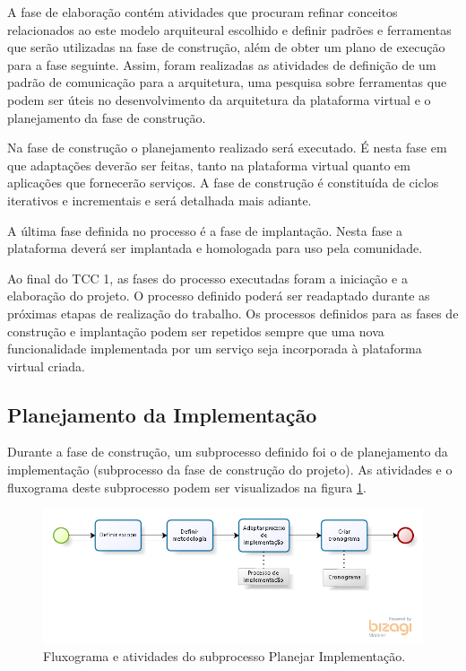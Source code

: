 A fase de elaboração contém atividades que procuram refinar conceitos relacionados ao este modelo arquiteural escolhido e definir padrões e ferramentas que serão utilizadas na fase de construção, além de obter um plano de execução para a fase seguinte. Assim, foram realizadas as atividades de definição de um padrão de comunicação para a arquitetura, uma pesquisa sobre ferramentas que podem ser úteis no desenvolvimento da arquitetura da plataforma virtual e o planejamento da fase de construção.

Na fase de construção o planejamento realizado será executado. É nesta fase em que adaptações deverão ser feitas, tanto na plataforma virtual quanto em aplicações que fornecerão serviços. A fase de construção é constituída de ciclos iterativos e incrementais e será detalhada mais adiante.

A última fase definida no processo é a fase de implantação. Nesta fase a plataforma deverá ser implantada e homologada para uso pela comunidade.

Ao final do TCC 1, as fases do processo executadas foram a iniciação e a elaboração do projeto. O processo definido poderá ser readaptado durante as próximas etapas de realização do trabalho. Os processos definidos para as fases de construção e implantação podem ser repetidos sempre que uma nova funcionalidade implementada por um serviço seja incorporada à plataforma virtual criada.

\subsection{Planejamento da Implementação}
Durante a fase de construção, um subprocesso definido foi o de planejamento da implementação (subprocesso da fase de construção do projeto). As atividades e o fluxograma deste subprocesso podem ser visualizados na figura \ref{subprocesso_planejamento}.

\begin{figure}[htb]
\centering
\includegraphics[width=1\textwidth]{figuras/subprocesso_planejamento.PNG}
\caption{Fluxograma e atividades do subprocesso Planejar Implementação.}
\label{subprocesso_planejamento}
\end{figure}

